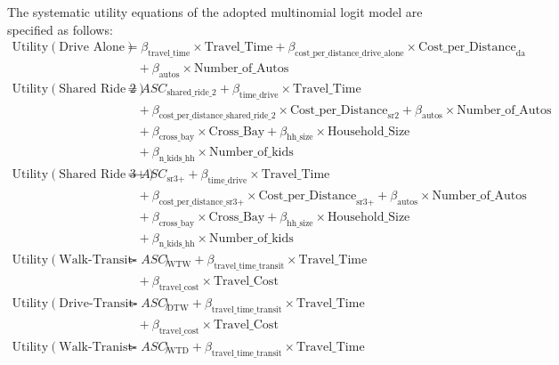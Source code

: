 The systematic utility equations of the adopted multinomial logit model are specified as follows:
\begin{equation*}
   \begin{aligned}
   \textrm{Utility} \left(\textrm{Drive Alone}\right) &= \beta_{\textrm{travel\_time}} \times \textrm{Travel\_Time} + \beta_{\textrm{cost\_per\_distance\_drive\_alone}} \times \textrm{Cost\_per\_Distance}_{\textrm{da}} \\
   &\quad + \beta_{\textrm{autos}} \times \textrm{Number\_of\_Autos} \\
   \textrm{Utility} \left(\textrm{Shared Ride 2}\right) &= ASC_{\textrm{shared\_ride\_2}} + \beta_{\textrm{time\_drive}} \times \textrm{Travel\_Time} \\
   &\quad + \beta_{\textrm{cost\_per\_distance\_shared\_ride\_2}} \times \textrm{Cost\_per\_Distance}_{ \textrm{sr2} } + \beta_{\textrm{autos}}  \times \textrm{Number\_of\_Autos} \\
   &\quad + \beta_{\textrm{cross\_bay}} \times \textrm{Cross\_Bay} + \beta_{\textrm{hh\_size}} \times \textrm{Household\_Size} \\
   &\quad + \beta_{\textrm{n\_kids\_hh}} \times \textrm{Number\_of\_kids} \\
   \textrm{Utility} \left(\textrm{Shared Ride 3+}\right) &= ASC_{\textrm{sr3+}} + \beta_{\textrm{time\_drive}} \times \textrm{Travel\_Time} \\
   &\quad + \beta_{\textrm{cost\_per\_distance\_sr3+}} \times \textrm{Cost\_per\_Distance}_{\textrm{sr3+}} + \beta_{\textrm{autos}}  \times \textrm{Number\_of\_Autos} \\
   &\quad + \beta_{\textrm{cross\_bay}} \times \textrm{Cross\_Bay} + \beta_{\textrm{hh\_size}} \times \textrm{Household\_Size} \\
   &\quad + \beta_{\textrm{n\_kids\_hh}} \times \textrm{Number\_of\_kids} \\
   \textrm{Utility} \left(\textrm{Walk-Transit-Walk}\right) &= ASC_{\textrm{WTW}} + \beta_{\textrm{travel\_time\_transit}} \times \textrm{Travel\_Time} \\
   &\quad + \beta_{\textrm{travel\_cost}} \times \textrm{Travel\_Cost} \\
   \textrm{Utility} \left(\textrm{Drive-Transit-Walk}\right) &= ASC_{\textrm{DTW}} + \beta_{\textrm{travel\_time\_transit}} \times \textrm{Travel\_Time} \\
   &\quad + \beta_{\textrm{travel\_cost}} \times \textrm{Travel\_Cost} \\
   \textrm{Utility} \left(\textrm{Walk-Tranist-Drive}\right) &= ASC_{\textrm{WTD}} + \beta_{\textrm{travel\_time\_transit}} \times \textrm{Travel\_Time} \\

\end{aligned}
\end{equation*}
